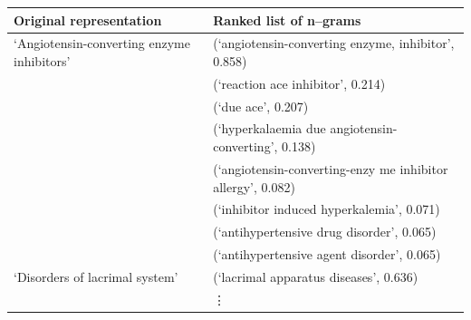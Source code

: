 \documentclass{sig-alternate}
\begin{document}
\begin{table}
\begin{center}
\begin{tabular}{l l}
\hline
Original representation &  Ranked list of n--grams \\
\hline
`Angiotensin-converting enzyme inhibitors' & (`angiotensin-converting enzyme, inhibitor', 0.858)\\
								 	& (`reaction ace inhibitor', 0.214)\\ 
									& (`due ace', 0.207)\\
									& (`hyperkalaemia due angiotensin-converting', 0.138)\\
									& (`angiotensin-converting-enzy me inhibitor allergy', 0.082)\\
									& (`inhibitor induced hyperkalemia', 0.071) \\
									& (`antihypertensive drug disorder', 0.065) \\
									& (`antihypertensive agent disorder', 0.065) \\
\hline
`Disorders of lacrimal system' & (`lacrimal apparatus diseases', 0.636)\\
& \vdots \\

\end{tabular}
\end{center}
\end{table}
\end{document}
